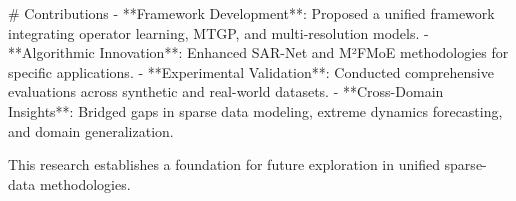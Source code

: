 # Contributions  
- **Framework Development**: Proposed a unified framework integrating operator learning, MTGP, and multi-resolution models.  
- **Algorithmic Innovation**: Enhanced SAR-Net and M²FMoE methodologies for specific applications.  
- **Experimental Validation**: Conducted comprehensive evaluations across synthetic and real-world datasets.  
- **Cross-Domain Insights**: Bridged gaps in sparse data modeling, extreme dynamics forecasting, and domain generalization.  

This research establishes a foundation for future exploration in unified sparse-data methodologies.